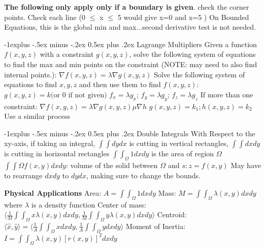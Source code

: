 \documentclass[8pt,landscape]{article}
\makeatletter
\renewcommand{\subsection}{\@startsection{subsection}{2}{0mm}%
                                {-1explus -.5ex minus -.2ex}%
                                {0.5ex plus .2ex}%
                                {\normalfont\normalsize\bfseries}}
\makeatother
\begin{document}
\begin{multicols*}{5}
\textbf{The following only apply only if a boundary is given}. check the corner points. Check each line (0 $\le$ x $\le$ 5 would give x=0 and x=5 )\newline
On Bounded Equations, this is the global min and max...second derivative test is not needed.

\subsection{Lagrange Multipliers}
Given a function $f(x, y, z)$ with a constraint $g(x, y, z)$, solve the following system of equations to find the max and min points on the constraint (NOTE: may need to also find internal points.):\newline
$ \nabla f (x, y, z) = \lambda \nabla g (x, y, z) $\newline
Solve the following system of equations to find $x, y, z$ and then use them to find $f(x, y, z)$:\newline
$ g(x,y, z) = k \text{(or 0 if not given)} $\newline
$f_x = \lambda g_x$; $f_y = \lambda g_y$; $f_z = \lambda g_z$\newline
If more than one constraint:
$ \nabla f (x, y, z) = \lambda \nabla g (x, y, z) \mu \nabla h$\newline
$ g(x,y, z) = k_1; h(x,y, z) = k_2 $\newline
Use a similar process

\subsection{Double Integrals}
With Respect to the xy-axis, if taking an integral,\newline
$ \int\int dy dx $ is cutting in vertical rectangles,\newline
$ \int\int dx dy $ is cutting in horizontal rectangles\newline
$\int\int_\Omega 1 dx dy$ is the area of region $\Omega$\newline
$\int\int\Omega f(x, y) dx dy$: volume of the solid between $\Omega$ and $s: z = f(x, y)$\newline
May have to rearrange $dxdy$ to $dydx$, making sure to change the bounds.\newline

\textbf{Physical Applications}\newline
Area: $A = \int\int_\Omega 1 dx dy$\newline
Mass: $M = \int\int_\Omega \lambda(x, y) dx dy$ where $\lambda$ is a density function\newline
Center of mass: $\langle \frac{1}{M} \int\int_\Omega x\lambda(x, y) dx dy, \frac{1}{M} \int\int_\Omega y\lambda(x, y) dx dy \rangle$\newline
Centroid: $\langle \hat{x}, \hat{y} \rangle = \langle \frac{1}{A} \int\int_\Omega x dx dy, \frac{1}{A} \int\int_\Omega y dx dy \rangle$\newline
Moment of Inertia: $I = \int\int_\Omega \lambda(x, y)[r(x, y)]^2 dx dy$


\end{multicols*}
\end{document}
